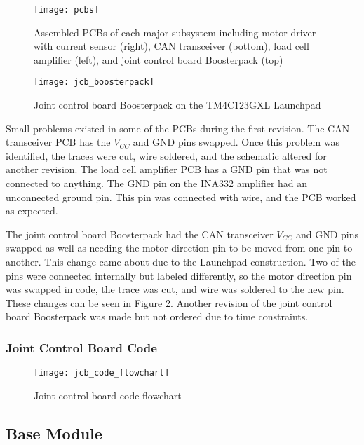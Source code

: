 \begin{figure}[H]
	\centering
	\texttt{[image: pcbs]}
	\caption{Assembled PCBs of each major subsystem including motor driver with current sensor (right), CAN transceiver (bottom), load cell amplifier (left), and joint control board Boosterpack (top)}
	\label{fig:pcbs}
\end{figure}

\begin{figure}[H]
\centering
\texttt{[image: jcb\_boosterpack]}
\caption{Joint control board Boosterpack on the TM4C123GXL Launchpad}
\label{fig:jcb_boosterpack}
\end{figure}

\noindent Small problems existed in some of the PCBs during the first revision. The CAN transceiver PCB has the $V_{CC}$ and GND pins swapped. Once this problem was identified, the traces were cut, wire soldered, and the schematic altered for another revision. The load cell amplifier PCB has a GND pin that was not connected to anything. The GND pin on the INA332 amplifier had an unconnected ground pin. This pin was connected with wire, and the PCB worked as expected.

\noindent The joint control board Boosterpack had the CAN transceiver $V_{CC}$ and GND pins swapped as well as needing the motor direction pin to be moved from one pin to another. This change came about due to the Launchpad construction. Two of the pins were connected internally but labeled differently, so the motor direction pin was swapped in code, the trace was cut, and wire was soldered to the new pin. These changes can be seen in Figure \ref{fig:jcb_boosterpack}. Another revision of the joint control board Boosterpack was made but not ordered due to time constraints.

\subsubsection{Joint Control Board Code}
\begin{figure}[H]
	\centering
	\texttt{[image: jcb\_code\_flowchart]}
	\caption{Joint control board code flowchart}
	\label{fig:jcb_code_flowchart}
\end{figure}

\subsection{Base Module}

